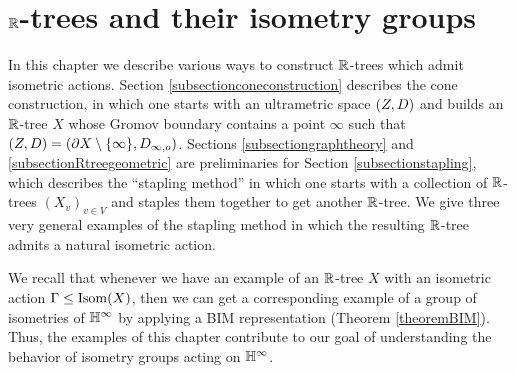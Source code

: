 %
%

\chapter{$\R$-trees and their isometry groups} \label{sectionRtrees}

In this chapter we describe various ways to construct $\R$-trees which admit isometric actions. Section \ref{subsectionconeconstruction} describes the cone construction, in which one starts with an ultrametric space $(Z,D)$ and builds an $\R$-tree $X$ whose Gromov boundary contains a point $\infty$ such that $(Z,D) = (\partial X\setminus\{\infty\},D_{\infty,o})$. Sections \ref{subsectiongraphtheory} and \ref{subsectionRtreegeometric} are preliminaries for Section \ref{subsectionstapling}, which describes the ``stapling method'' in which one starts with a collection of $\R$-trees $(X_v)_{v\in V}$ and staples them together to get another $\R$-tree. We give three very general examples of the stapling method in which the resulting $\R$-tree admits a natural isometric action.

We recall that whenever we have an example of an $\R$-tree $X$ with an isometric action $\Gamma\leq\operatorname{Isom}(X)$, then we can get a corresponding example of a group of isometries of $\H^\infty$ by applying a BIM representation (Theorem \ref{theoremBIM}). Thus, the examples of this chapter contribute to our goal of understanding the behavior of isometry groups acting on $\H^\infty$.

